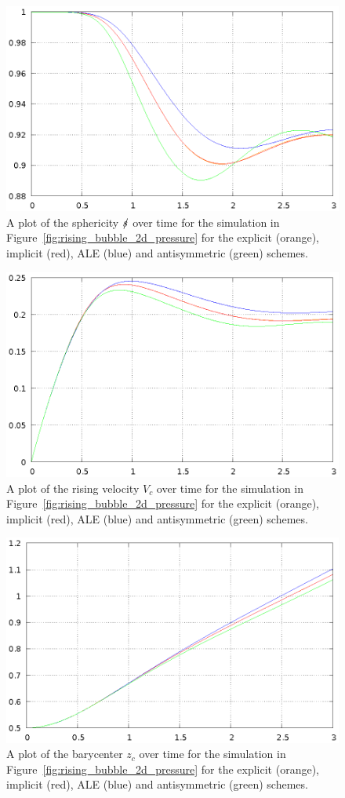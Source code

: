 \begin{figure}[htbp]
\centering
\includegraphics[width=.45\textwidth]
{figures/navier_stokes/2d_rising_bubble_sphericity.ps}
\caption[Navier--Stokes 2d rising bubble sphericity]
{A plot of the sphericity $\mbox{$s\!\!\!\!\:/$}$ over time for the simulation in
Figure~\ref{fig:rising_bubble_2d_pressure} for the explicit (orange), implicit
(red), ALE (blue) and antisymmetric (green) schemes.}
\label{fig:rising_bubble_2d_bulk_sphericity}
\end{figure}

\begin{figure}[htbp]
\centering
\includegraphics[width=.45\textwidth]
{figures/navier_stokes/2d_rising_bubble_rising_velocity.ps}
\caption[Navier--Stokes 2d rising bubble rising velocity]
{A plot of the rising velocity $V_c$ over time for the simulation in
Figure~\ref{fig:rising_bubble_2d_pressure} for the explicit (orange), implicit
(red), ALE (blue) and antisymmetric (green) schemes.}
\label{fig:rising_bubble_2d_bulk_rising_velocity}
\end{figure}

\begin{figure}[htbp]
\centering
\includegraphics[width=.45\textwidth]
{figures/navier_stokes/2d_rising_bubble_barycenter.ps}
\caption[Navier--Stokes 2d rising bubble barycenter]
{A plot of the barycenter $z_c$ over time for the simulation in
Figure~\ref{fig:rising_bubble_2d_pressure} for the explicit (orange), implicit
(red), ALE (blue) and antisymmetric (green) schemes.}
\label{fig:rising_bubble_2d_bulk_barycenter}
\end{figure}

